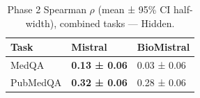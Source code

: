 \begin{table}
\caption{Phase 2 Spearman $\rho$ (mean ± 95\% CI half-width), combined tasks — Hidden.}
\label{tab:phase2_spearman_all_hidden_probe_oof}
\begin{tabular}{lll}
\toprule
Task & Mistral & BioMistral \\
\midrule
MedQA & \textbf{0.13 ± 0.06} & 0.03 ± 0.06 \\
PubMedQA & \textbf{0.32 ± 0.06} & 0.28 ± 0.06 \\
\bottomrule
\end{tabular}
\end{table}
